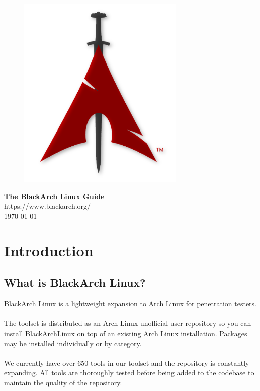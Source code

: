 \documentclass[a4paper, oneside, 11pt]{book}
\begin{document}
\pagestyle{empty}
\begin{center}
\begin{figure}[htbp]
\centering
\vspace{0.5cm}
\includegraphics[width=8cm]{logo.png}
\label{fig:logo}
\end{figure}
\vspace{0.5cm}
\Huge{\textbf{The BlackArch Linux Guide}}\\
\vspace{1cm}
\Large{\color{red}https://www.blackarch.org/}\\
\vspace{0.5cm}
\Large{\today}
\end{center}
\newpage
\tableofcontents
\newpage
\pagestyle{fancy}


\chapter{Introduction}

\section{What is BlackArch Linux?}
\href{http://www.blackarch.org}{BlackArch Linux} is a lightweight expansion to
Arch Linux for penetration testers.
\\\\
The toolset is distributed as an Arch Linux
\href{https://wiki.archlinux.org/index.php/Unofficial\_User\_Repositories}
{unofficial user repository} so you can install BlackArchLinux on top of an
existing Arch Linux installation. Packages may be installed individually or by
category.
\\\\
We currently have over 650 tools in our toolset and the repository is constantly
expanding. All tools are thoroughly tested before being added to the codebase to
maintain the quality of the repository.
\end{document}
